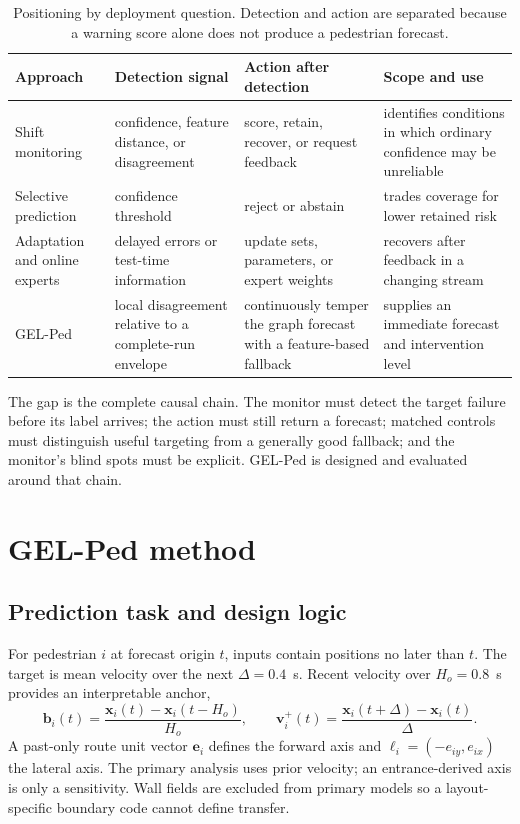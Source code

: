 \documentclass[preprint,11pt,authoryear]{elsarticle}
\begin{document}
\begin{table}[!htbp]
\centering
\caption{Positioning by deployment question. Detection and action are separated because a warning score alone does not produce a pedestrian forecast.}
\label{tab:positioning}
\footnotesize
\renewcommand{\arraystretch}{1.10}
\begin{tabularx}{\textwidth}{>{\raggedright\arraybackslash}p{}>{\raggedright\arraybackslash}p{}>{\raggedright\arraybackslash}p{}X}
\toprule
Approach & Detection signal & Action after detection & Scope and use \\
\midrule
Shift monitoring & confidence, feature distance, or disagreement & score, retain, recover, or request feedback & identifies conditions in which ordinary confidence may be unreliable \\
Selective prediction & confidence threshold & reject or abstain & trades coverage for lower retained risk \\
Adaptation and online experts & delayed errors or test-time information & update sets, parameters, or expert weights & recovers after feedback in a changing stream \\
GEL-Ped & local disagreement relative to a complete-run envelope & continuously temper the graph forecast with a feature-based fallback & supplies an immediate forecast and intervention level \\
\bottomrule
\end{tabularx}
\end{table}

The gap is the complete causal chain. The monitor must detect the target failure before its label arrives; the action must still return a forecast; matched controls must distinguish useful targeting from a generally good fallback; and the monitor's blind spots must be explicit. GEL-Ped is designed and evaluated around that chain.

\section{GEL-Ped method}
\label{sec:method}
\subsection{Prediction task and design logic}
For pedestrian $i$ at forecast origin $t$, inputs contain positions no later than $t$. The target is mean velocity over the next $\Delta=0.4$~s. Recent velocity over $H_o=0.8$~s provides an interpretable anchor,
\begin{equation}
\label{eq:anchor}
\mathbf b_i(t)=\frac{\mathbf x_i(t)-\mathbf x_i(t-H_o)}{H_o},
\qquad
\mathbf v_i^+(t)=\frac{\mathbf x_i(t+\Delta)-\mathbf x_i(t)}{\Delta}.
\end{equation}
A past-only route unit vector $\mathbf e_i$ defines the forward axis and $\boldsymbol\ell_i=(-e_{iy},e_{ix})$ the lateral axis. The primary analysis uses prior velocity; an entrance-derived axis is only a sensitivity. Wall fields are excluded from primary models so a layout-specific boundary code cannot define transfer.
\end{document}
